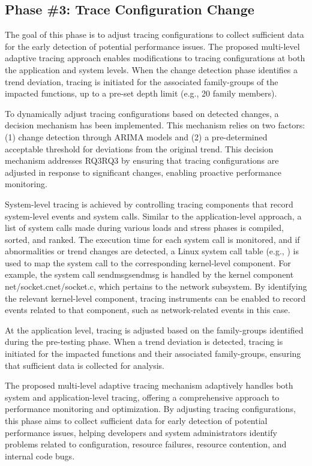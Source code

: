 \documentclass[pdflatex,sn-nature]{sn-jnl}%
\theoremstyle{thmstyleone}%
\theoremstyle{thmstyletwo}%
\theoremstyle{thmstylethree}%
\begin{document}
\subsection{Phase \#3: Trace Configuration Change}

The goal of this phase is to adjust tracing configurations to collect sufficient data for the early detection of potential performance issues. The proposed multi-level adaptive tracing approach enables modifications to tracing configurations at both the application and system levels. When the change detection phase identifies a trend deviation, tracing is initiated for the associated family-groups of the impacted functions, up to a pre-set depth limit (e.g., 20 family members).

To dynamically adjust tracing configurations based on detected changes, a decision mechanism has been implemented. This mechanism relies on two factors: (1) change detection through ARIMA models and (2) a pre-determined acceptable threshold for deviations from the original trend. This decision mechanism addresses RQ3RQ3 by ensuring that tracing configurations are adjusted in response to significant changes, enabling proactive performance monitoring.

System-level tracing is achieved by controlling tracing components that record system-level events and system calls. Similar to the application-level approach, a list of system calls made during various loads and stress phases is compiled, sorted, and ranked. The execution time for each system call is monitored, and if abnormalities or trend changes are detected, a Linux system call table (e.g., \cite{valsorda-no-date}) is used to map the system call to the corresponding kernel-level component. For example, the system call sendmsgsendmsg is handled by the kernel component net/socket.cnet/socket.c, which pertains to the network subsystem. By identifying the relevant kernel-level component, tracing instruments can be enabled to record events related to that component, such as network-related events in this case.

At the application level, tracing is adjusted based on the family-groups identified during the pre-testing phase. When a trend deviation is detected, tracing is initiated for the impacted functions and their associated family-groups, ensuring that sufficient data is collected for analysis.

The proposed multi-level adaptive tracing mechanism adaptively handles both system and application-level tracing, offering a comprehensive approach to performance monitoring and optimization. By adjusting tracing configurations, this phase aims to collect sufficient data for early detection of potential performance issues, helping developers and system administrators identify problems related to configuration, resource failures, resource contention, and internal code bugs.
\end{document}
